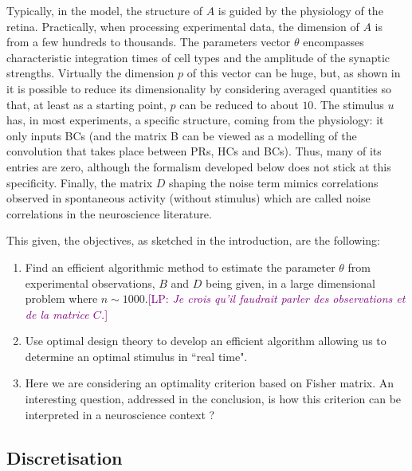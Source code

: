 \documentclass[a4paper]{article}
\newcommand{\LP}[1]{{\textcolor{purple}{[LP: \textit{#1}]}}}
\newcommand{\Luc}{\color{magenta} }
\theoremstyle{definition}
\theoremstyle{remark}
\begin{document}
Typically, in the model, the structure of $A$ is guided by the physiology of the retina. 
Practically, when processing experimental data, the dimension of $A$ is from a few hundreds to thousands. The parameters vector $\theta$ encompasses characteristic integration times of cell types and the amplitude of the synaptic strengths. Virtually the dimension $p$ of this vector can be huge, but, as shown in \cite{kartsaki-hilgen-etal:24} it is possible to reduce its dimensionality by considering averaged quantities so that, at least as a starting point, $p$ can be reduced to about $10$.  The stimulus $u$ has, in most experiments, a specific structure, coming from the physiology: it only inputs BCs (and the matrix B can be viewed as a modelling of the convolution that takes place between PRs, HCs and BCs). Thus, many of its entries are zero, although the formalism developed below does not stick at this specificity. Finally, the matrix $D$ shaping the noise term mimics correlations observed in spontaneous activity (without stimulus) {\Luc which are called noise correlations in the neuroscience literature}. 
 
This given, the objectives, as sketched in the introduction, are the following:
 \begin{enumerate}
     \item Find an efficient algorithmic method to estimate the parameter $\theta$ from experimental observations, $B$ and $D$ being given, in a large dimensional problem where $n \sim 1000$.\LP{Je crois qu'il faudrait parler des observations et de la matrice $C$.}
     \item Use optimal design theory to develop an efficient algorithm allowing us to determine an optimal stimulus in ``real time".
     \item Here we are considering an optimality criterion based on Fisher matrix. An interesting question, addressed in the conclusion, is how this criterion can be interpreted in a neuroscience context ?
 \end{enumerate}
 
\subsection{Discretisation}
\label{S:discretization}
\end{document}
